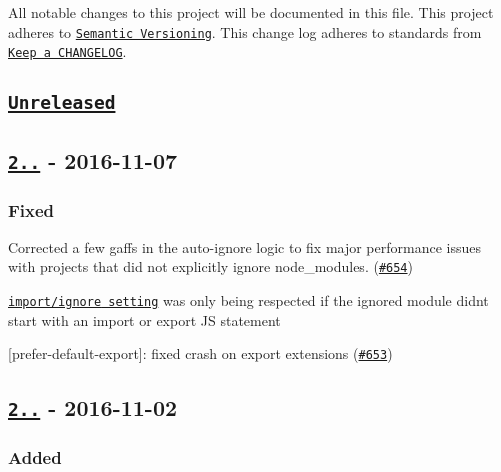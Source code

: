 All notable changes to this project will be documented in this file. This project adheres to \href{http://semver.org/}{\tt Semantic Versioning}. This change log adheres to standards from \href{http://keepachangelog.com}{\tt Keep a C\+H\+A\+N\+G\+E\+L\+OG}.

\subsection*{\href{https://github.com/benmosher/eslint-plugin-import/compare/v2.2.0...HEAD}{\tt Unreleased}}

\subsection*{\href{https://github.com/benmosher/eslint-plugin-import/compare/v2.1.0...v2.2.0}{\tt 2..} -\/ 2016-\/11-\/07}

\subsubsection*{Fixed}


\begin{DoxyItemize}
\item Corrected a few gaffs in the auto-\/ignore logic to fix major performance issues with projects that did not explicitly ignore {\ttfamily node\+\_\+modules}. (\href{https://github.com/benmosher/eslint-plugin-import/pull/654}{\tt \#654})
\item \href{./README.md#importignore}{\tt {\ttfamily import/ignore} setting} was only being respected if the ignored module didn\textquotesingle{}t start with an {\ttfamily import} or {\ttfamily export} JS statement
\item \mbox{[}{\ttfamily prefer-\/default-\/export}\mbox{]}\+: fixed crash on export extensions (\href{https://github.com/benmosher/eslint-plugin-import/issues/653}{\tt \#653})
\end{DoxyItemize}

\subsection*{\href{https://github.com/benmosher/eslint-plugin-import/compare/v2.0.1...v2.1.0}{\tt 2..} -\/ 2016-\/11-\/02}

\subsubsection*{Added}


